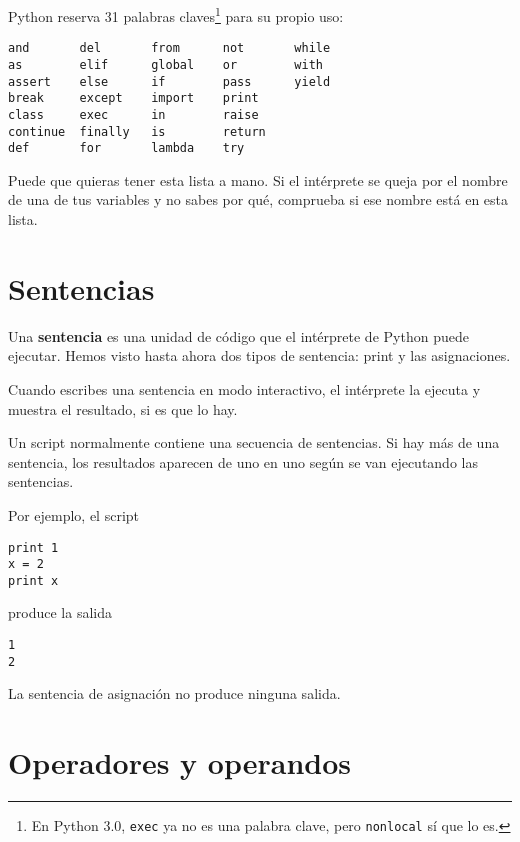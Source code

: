 
Python reserva 31 palabras claves\footnote{En Python 3.0, {\tt exec} ya no es
una palabra clave, pero {\tt nonlocal} sí que lo es.} para su propio uso:

\beforeverb
\begin{verbatim}
and       del       from      not       while    
as        elif      global    or        with     
assert    else      if        pass      yield    
break     except    import    print              
class     exec      in        raise              
continue  finally   is        return             
def       for       lambda    try
\end{verbatim}
\afterverb
%
Puede que quieras tener esta lista a mano. Si el intérprete se queja
por el nombre de una de tus variables y no sabes por qué, comprueba
si ese nombre está en esta lista.

\section{Sentencias}

Una {\bf sentencia} es una unidad de código que el intérprete de Python puede
ejecutar. Hemos visto hasta ahora dos tipos de sentencia: print
y las asignaciones.


Cuando escribes una sentencia en modo interactivo, el intérprete la
ejecuta y muestra el resultado, si es que lo hay.

Un script normalmente contiene una secuencia de sentencias. Si hay
más de una sentencia, los resultados aparecen de uno en uno
según se van ejecutando las sentencias.

Por ejemplo, el script

\beforeverb
\begin{verbatim}
print 1
x = 2
print x
\end{verbatim}
\afterverb
%
produce la salida

\beforeverb
\begin{verbatim}
1
2
\end{verbatim}
\afterverb
%
La sentencia de asignación no produce ninguna salida.


\section{Operadores y operandos}

